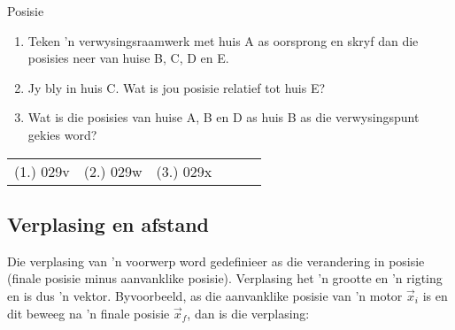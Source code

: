 \begin{exercises}{Posisie}
\begin{enumerate}[noitemsep, label=\textbf{\arabic*}. ]
 
\begin{enumerate}[noitemsep, label=\textbf{\alph*}. ] 
    \item Teken 'n verwysingsraamwerk met huis A as oorsprong en skryf dan die posisies neer van huise B, C, D en E.
    \item Jy bly in huis C. Wat is jou posisie relatief tot huis E?
    \item Wat is die posisies van huise A, B en D as huis B as die verwysingspunt gekies word?
\end{enumerate}
\end{enumerate}

\practiceinfo
 \par \begin{tabular}[h]{cccccc}
 (1.) 029v  &  (2.) 029w  &  (3.) 029x  & \end{tabular}
\end{exercises}

\subsection*{Verplasing en afstand}
    \nopagebreak
{}

Die verplasing van 'n voorwerp word gedefinieer as die verandering in posisie (finale posisie minus aanvanklike posisie). Verplasing het 'n grootte en 'n rigting en is dus 'n vektor. Byvoorbeeld, as die aanvanklike posisie van 'n motor $\vec{x}_{i}$ is en dit beweeg na 'n finale posisie $\vec{x}_{f}$, dan is die verplasing:


